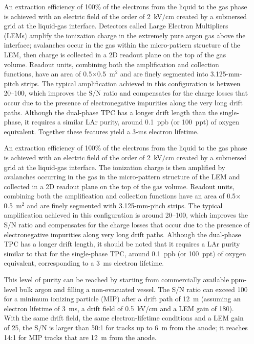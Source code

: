 An extraction efficiency of 100\% of the electrons from the liquid to
the gas phase is achieved with an electric field of the order of
2~kV/cm created by a submersed grid at the liquid-gas interface. Detectors
called Large Electron Multipliers (LEMs) amplify the
ionization charge in the extremely pure argon gas above the interface; avalanches occur in the gas
within the micro-pattern structure of the LEM, then charge is collected in a 2D
readout plane on the top of the gas volume.  Readout units, combining
both the amplification and collection functions, have an area of
0.5$\times$0.5~m$^2$ and are finely segmented into 3.125-mm-pitch
strips. 
The typical amplification achieved in this configuration is
between 20--100, which improves the S/N ratio and compensates for the
charge losses that occur due to the presence of electronegative
impurities along the very long drift paths. Although the dual-phase TPC
has a longer drift length than the single-phase, %
 it requires a similar LAr
purity, %
around 0.1~ppb (or
100~ppt) of oxygen equivalent. %
Together these features yield a 3-ms electron lifetime.

An extraction efficiency of 100\% of the electrons from the liquid to
the gas phase is achieved with an electric field of the order of
2~kV/cm created by a submersed grid at the liquid-gas interface. The
ionization charge is then amplified by avalanches occurring in the gas
in the micro-pattern structure of the LEM and collected in a 2D
readout plane on the top of the gas volume. Readout units, combining
both the amplification and collection functions have an area of
0.5$\times$0.5~m$^2$ and are finely segmented with 3.125-mm-pitch
strips. The typical amplification achieved in this configuration is
around 20--100, which improves the S/N ratio and compensates for the
charge losses that occur due to the presence of electronegative
impurities along very long drift paths. Although the dual-phase TPC
has a longer drift length, it should be noted that it requires a LAr
purity similar to that for the single-phase TPC, around 0.1~ppb (or
100~ppt) of oxygen equivalent, corresponding to a 3~ms electron
lifetime.



This level of purity can be reached by starting from commercially
available ppm-level bulk argon and filling a non-evacuated
vessel\cite{WA105_TDR}.  The S/N ratio can exceed 100 for a minimum
ionizing particle (MIP) after a drift path of 12~m (assuming an
electron lifetime of 3~ms, a drift field of 0.5~kV/cm and a LEM gain
of 180). With the same drift field, the same electron-lifetime conditions and a
LEM gain of 25, the S/N is larger than 50:1 for tracks up to 6~m from
the anode; it reaches 14:1 for MIP tracks that are 12~m from the
anode.

